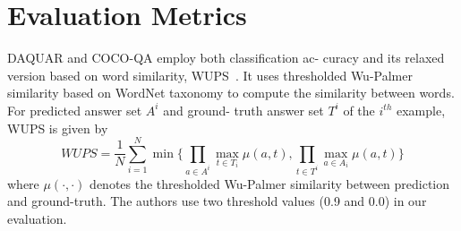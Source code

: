 \documentclass[10pt,twocolumn,letterpaper]{article}
\begin{document}
\section{Evaluation Metrics}
DAQUAR and COCO-QA employ both classification ac-
curacy and its relaxed version based on word similarity,
WUPS~\cite{name17}. It uses thresholded Wu-Palmer similarity
based on WordNet taxonomy to compute the similarity
between words. For predicted answer set $A^i$ and ground-
truth answer set $T^i$ of the $i^{th}$ example, WUPS is given by
\begin{equation}
WUPS=\frac{1}{N}\sum_{i=1}^{N}\min\{\prod_{a\in{A^i}}\max_{t\in{T_i}}\mu(a,t),\prod_{t\in{T^i}}\max_{a\in{A_i}}\mu(a,t)\}
\end{equation}
where $\mu(\cdot, \cdot)$ denotes the thresholded Wu-Palmer similarity
between prediction and ground-truth. The authors use two threshold
values (0.9 and 0.0) in our evaluation.


\end{document}
